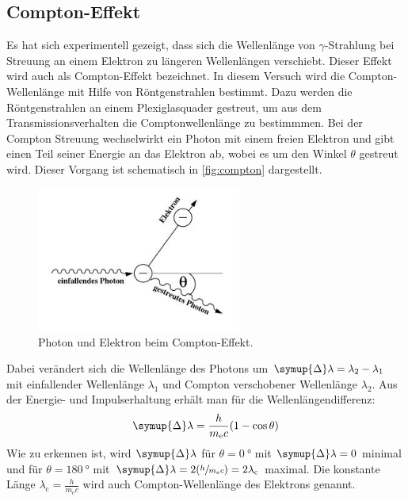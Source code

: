 \subsection{Compton-Effekt}
Es hat sich experimentell gezeigt, dass sich die Wellenlänge von $\gamma$-Strahlung bei Streuung an einem Elektron zu längeren Wellenlängen verschiebt. Dieser Effekt wird auch als Compton-Effekt bezeichnet. In diesem Versuch wird die Compton-Wellenlänge mit Hilfe von Röntgenstrahlen bestimmt. Dazu werden die Röntgenstrahlen an einem Plexiglasquader gestreut, um aus dem Transmissionsverhalten die Comptonwellenlänge zu bestimmmen. 
\newline
\noindent
Bei der Compton Streuung wechselwirkt ein Photon mit einem freien Elektron und gibt einen
Teil seiner Energie an das Elektron ab, wobei es um den Winkel $\theta$ gestreut wird. Dieser Vorgang ist schematisch in \autoref{fig:compton} dargestellt.
\begin{figure}[H]
    \centering
     \includegraphics[width=0.6\textwidth]{images/compton.jpg}
     \caption{Photon und Elektron beim Compton-Effekt. \cite{603}}
    \label{fig:compton}
 \end{figure}
 \noindent
 Dabei verändert sich die Wellenlänge des Photons um $\symup{\Delta}\lambda = \lambda_2 - \lambda_1$ mit einfallender Wellenlänge $\lambda_1$ und Compton verschobener Wellenlänge $\lambda_2$. Aus der
 Energie- und Impulserhaltung erhält man für die Wellenlängendifferenz:
 \begin{equation}
    \symup{\Delta}\lambda = \frac{h}{m_\text{e} c}(1 - \cos{\theta})
    \label{eqn:wellenl}
\end{equation} 
\noindent
Wie zu erkennen ist, wird $\symup{\Delta}\lambda$ für $\theta = \SI{0}{\degree}$ mit $\symup{\Delta}\lambda = 0$ minimal und für $\theta = \SI{180}{\degree}$ mit $\symup{\Delta}\lambda = 2(\sfrac{h}{m_\text{e}c})= 2\lambda_\text{c}$ maximal. 
Die konstante Länge $\lambda_\text{c} = \frac{h}{m_\text{e}c}$ wird auch Compton-Wellenlänge des Elektrons genannt.